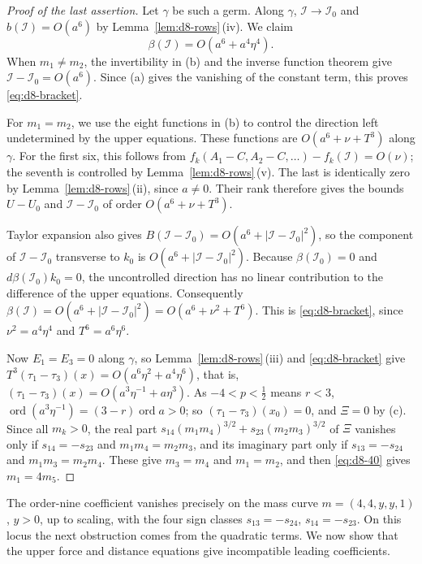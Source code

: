 \documentclass[Threeside,11pt]{article}
\theoremstyle{definition}
\theoremstyle{remark}
\numberwithin{equation}{section}
\theoremstyle{remark}
\newcommand{\ord}{\operatorname{ord}}
\begin{document}
{}\begin{proof}[Proof of the last assertion]
Let $\gamma$ be such a germ.  Along $\gamma$, $\mathcal I\to\mathcal I_0$ and
$b(\mathcal I)=O(a^6)$ by Lemma~\ref{lem:d8-rows}\,(iv).  We claim
\begin{equation}\label{eq:d8-bracket}
  \beta(\mathcal I)=O(a^6+a^4\eta^4).
\end{equation}
When $m_1\ne m_2$, the invertibility in (b) and the inverse function theorem
give $\mathcal I-\mathcal I_0=O(a^6)$.  Since (a) gives the vanishing of the constant
term, this proves \eqref{eq:d8-bracket}.

For $m_1=m_2$, we use the eight functions in (b) to control the direction left
undetermined by the upper equations.  These functions are $O(a^6+\nu+T^3)$ along
$\gamma$.  For the first six, this follows from
$f_k(A_1-C,A_2-C,\dots)-f_k(\mathcal I)=O(\nu)$; the seventh is controlled by
Lemma~\ref{lem:d8-rows}\,(v).  The last is identically zero by
Lemma~\ref{lem:d8-rows}\,(ii), since $a\ne0$.  Their rank therefore gives the bounds
$U-U_0$ and $\mathcal I-\mathcal I_0$ of order $O(a^6+\nu+T^3)$.

Taylor expansion also gives
$B(\mathcal I-\mathcal I_0)=O(a^6+|\mathcal I-\mathcal I_0|^2)$, so the component of
$\mathcal I-\mathcal I_0$ transverse to $k_0$ is
$O(a^6+|\mathcal I-\mathcal I_0|^2)$.  Because $\beta(\mathcal I_0)=0$ and
$d\beta(\mathcal I_0)k_0=0$, the uncontrolled direction has no linear contribution
to the difference of the upper equations.  Consequently
$\beta(\mathcal I)=O(a^6+|\mathcal I-\mathcal I_0|^2)=O(a^6+\nu^2+T^6)$.
This is \eqref{eq:d8-bracket}, since $\nu^2=a^4\eta^4$ and $T^6=a^6\eta^6$.

Now $E_1=E_3=0$ along $\gamma$, so Lemma~\ref{lem:d8-rows}\,(iii) and \eqref{eq:d8-bracket}
give $T^3(\tau_1-\tau_3)(x)=O(a^6\eta^2+a^4\eta^6)$, that is,
$(\tau_1-\tau_3)(x)=O(a^3\eta^{-1}+a\eta^3)$.  As $-4<p<\frac12$ means $r<3$,
$\ord(a^3\eta^{-1})=(3-r)\ord a>0$; so $(\tau_1-\tau_3)(x_0)=0$, and $\Xi=0$ by (c).  Since all
$m_k>0$, the real part $s_{14}(m_1m_4)^{3/2}+s_{23}(m_2m_3)^{3/2}$ of $\Xi$ vanishes only if
$s_{14}=-s_{23}$ and $m_1m_4=m_2m_3$, and its imaginary part only if $s_{13}=-s_{24}$ and
$m_1m_3=m_2m_4$.  These give $m_3=m_4$ and $m_1=m_2$, and then \eqref{eq:d8-40} gives
$m_1=4m_5$.
\end{proof}

The order-nine coefficient vanishes precisely on the mass curve
$m=(4,4,y,y,1)$, $y>0$, up to scaling, with the four sign classes
$s_{13}=-s_{24}$, $s_{14}=-s_{23}$.  On this locus the next obstruction comes from the quadratic terms.
We now show that the upper force and distance equations give incompatible
leading coefficients.
\end{document}
